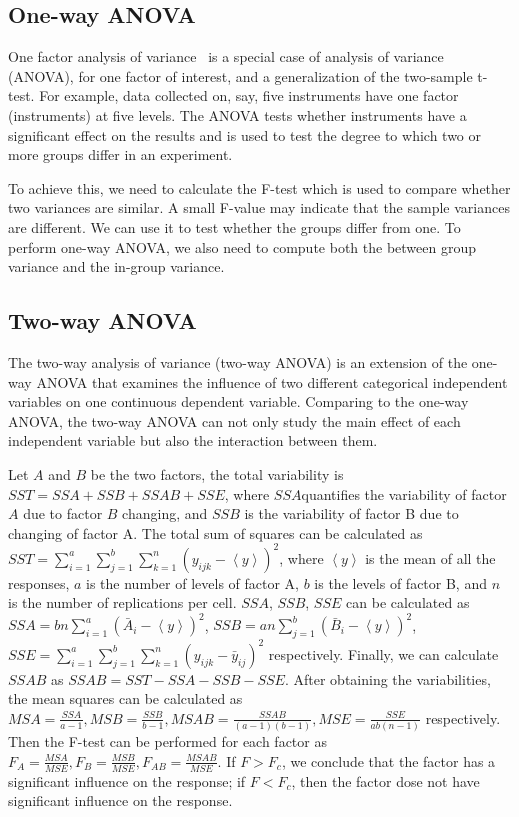 \documentclass[letterpaper,twocolumn,10pt]{article}
\begin{document}
\subsection{One-way ANOVA}
One factor analysis of variance~\cite{Anova} is a special case of analysis of variance (ANOVA), for one factor of interest, and a generalization of the two-sample t-test. For example, data collected on, say, five instruments have one factor (instruments) at five levels. The ANOVA tests whether instruments have a significant effect on the results and is used to test the degree to which two or more groups differ in an experiment.

To achieve this, we need to calculate the F-test which is used to compare whether two variances are similar. A small F-value may indicate that the sample variances are different. We can use it to test whether the groups differ from one. To perform one-way ANOVA, we also need to compute both the between
group variance and the in-group variance. 

\subsection{Two-way ANOVA}
The two-way analysis of variance (two-way ANOVA) is an extension of the one-way ANOVA that examines the influence of two different categorical independent variables on one continuous dependent variable. Comparing to the one-way ANOVA, the two-way ANOVA can not only study the main effect of each independent variable but also the interaction between them. 

Let $A$ and $B$ be the two factors, the total variability is $SST=SSA+SSB+SSAB+SSE$, where $SSA$quantifies the variability of factor $A$ due to factor $B$ changing, and $SSB$ is the variability of factor B due to changing of factor A. The total sum of squares can be calculated as $SST=\sum\limits_{i=1}^{a}\sum\limits_{j=1}^{b}\sum\limits_{k=1}^{n}\left( y_{ijk}-\left\langle y\right\rangle \right) ^2$, where $\left\langle y\right\rangle$ is the mean of all the responses, $a$ is the number of levels of factor A, $b$ is the levels of factor B, and $n$ is the number of replications per cell. $SSA$, $SSB$, $SSE$ can be calculated as $SSA=bn\sum\limits_{i=1}^{a}(\bar{A}_i- \left\langle y\right\rangle)^2$, $SSB=an\sum\limits_{j=1}^{b}(\bar{B}_i- \left\langle y\right\rangle)^2$, $SSE=\sum\limits_{i=1}^{a}\sum\limits_{j=1}^{b}\sum\limits_{k=1}^{n}(y_{ijk}-\bar{y}_{ij})^2$ respectively. Finally, we can calculate $SSAB$ as $SSAB=SST-SSA-SSB-SSE$. After obtaining the variabilities, the mean squares can be calculated as $MSA=\frac{SSA}{a-1},MSB=\frac{SSB}{b-1},MSAB=\frac{SSAB}{(a-1)(b-1)},MSE=\frac{SSE}{ab(n-1)}$ respectively. Then the F-test can be performed for each factor as $F_A=\frac{MSA}{MSE},F_B=\frac{MSB}{MSE},F_{AB}=\frac{MSAB}{MSE}$. If $F>F_c$, we conclude that the factor has a significant influence on the response; if $F<F_c$, then the factor dose not have significant influence on the response. 
\end{document}
